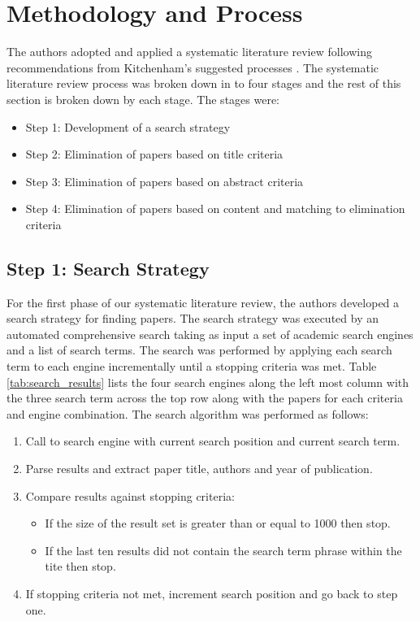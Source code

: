 \section{Methodology and Process} \label{sec:process}

The authors adopted and applied a systematic literature review following recommendations from Kitchenham's suggested processes \cite{kitchenham2007guidelines}.  The systematic literature review process was broken down in to four stages and the rest of this section is broken down by each stage.  The stages were:

\begin{itemize}
\setlength{\itemsep}{0.25pt}
\item Step 1: Development of a search strategy
\item Step 2: Elimination of papers based on title criteria
\item Step 3: Elimination of papers based on abstract criteria
\item Step 4: Elimination of papers based on content and matching to elimination criteria
\end{itemize}

\subsection{Step 1: Search Strategy}

For the first phase of our systematic literature review, the authors developed a search strategy for finding papers.  The search strategy was executed by an automated comprehensive search taking as input a set of academic search engines and a list of search terms.  The search was performed by applying each search term to each engine incrementally until a stopping criteria was met. Table \ref{tab:search_results} lists the four search engines along the left most column with the three search term across the top row along with the papers for each criteria and engine combination.  The search algorithm was performed as follows:

\begin{enumerate}
\setlength{\itemsep}{0.25pt}
\item Call to search engine with current search position and current search term.
\item Parse results and extract paper title, authors and year of publication.
\item Compare results against stopping criteria:
	\begin{itemize}
	\item If the size of the result set is greater than or equal to 1000 then stop.
	\item If the last ten results did not contain the search term phrase within the tite then stop.
	\end{itemize}
\item If stopping criteria not met, increment search position and go back to step one.
\end{enumerate}

